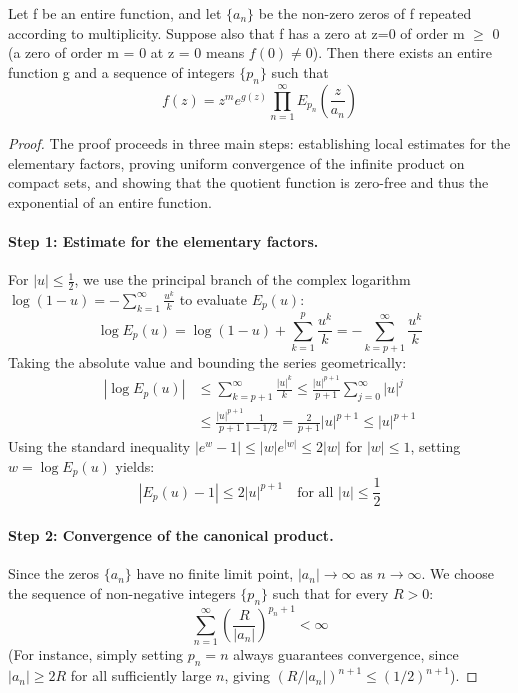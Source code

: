 \documentclass[a4paper]{article}
\begin{document}
\begin{theorem}
Let f be an entire function, and let $\{a_n\}$ be the non-zero zeros of f repeated according to multiplicity. Suppose also that f has a zero at z=0 of order m $\geq$ 0 (a zero of order m = 0 at z = 0 means $f(0) \not = 0$). Then there exists an entire function g and a sequence of integers  $\{p_n\}$ such that
\begin{equation}
f(z) = z^m e^{g(z)} \prod_{n=1}^{\infty} E_{p_n}(\frac{z}{a_n})
\end{equation}



\begin{proof}
The proof proceeds in three main steps: establishing local estimates for the elementary factors, proving uniform convergence of the infinite product on compact sets, and showing that the quotient function is zero-free and thus the exponential of an entire function.

\paragraph{Step 1: Estimate for the elementary factors.}
For $|u| \leq \frac{1}{2}$, we use the principal branch of the complex logarithm $\log(1-u) = -\sum_{k=1}^{\infty} \frac{u^k}{k}$ to evaluate $E_p(u)$:
\begin{equation*}
\log E_p(u) = \log(1-u) + \sum_{k=1}^{p} \frac{u^k}{k} = -\sum_{k=p+1}^{\infty} \frac{u^k}{k}
\end{equation*}
Taking the absolute value and bounding the series geometrically:
\begin{align*}
|\log E_p(u)| &\leq \sum_{k=p+1}^{\infty} \frac{|u|^k}{k} \leq \frac{|u|^{p+1}}{p+1} \sum_{j=0}^{\infty} |u|^j \\
&\leq \frac{|u|^{p+1}}{p+1} \frac{1}{1 - 1/2} = \frac{2}{p+1} |u|^{p+1} \leq |u|^{p+1}
\end{align*}
Using the standard inequality $|e^w - 1| \leq |w| e^{|w|} \leq 2|w|$ for $|w| \leq 1$, setting $w = \log E_p(u)$ yields:
\begin{equation*}
|E_p(u) - 1| \leq 2 |u|^{p+1} \quad \text{for all } |u| \leq \frac{1}{2}
\end{equation*}

\paragraph{Step 2: Convergence of the canonical product.}
Since the zeros $\{a_n\}$ have no finite limit point, $|a_n| \to \infty$ as $n \to \infty$. We choose the sequence of non-negative integers $\{p_n\}$ such that for every $R > 0$:
\begin{equation*}
\sum_{n=1}^{\infty} \left( \frac{R}{|a_n|} \right)^{p_n + 1} < \infty
\end{equation*}
(For instance, simply setting $p_n = n$ always guarantees convergence, since $|a_n| \geq 2R$ for all sufficiently large $n$, giving $(R/|a_n|)^{n+1} \leq (1/2)^{n+1}$).


\end{proof}
\end{theorem}
\end{document}
